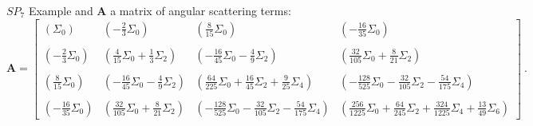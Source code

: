 \documentclass{beamer}
\begin{document}
\begin{frame}{$SP_7$ Example}
  and $\mathbf{A}$ a matrix of angular scattering terms:
  {\tiny
    \begin{equation}
      \mathbf{A} = 
      \begin{bmatrix}
        (\Sigma_0) &
        (-\frac{2}{3}\Sigma_0) &
        (\frac{8}{15}\Sigma_0) &
        (-\frac{16}{35}\Sigma_0) \\
        &&&\\
        (-\frac{2}{3}\Sigma_0) &
        (\frac{4}{15}\Sigma_0 + \frac{1}{3}\Sigma_2) &
        (-\frac{16}{45}\Sigma_0 - \frac{4}{9}\Sigma_2) &
        (\frac{32}{105}\Sigma_0 + \frac{8}{21}\Sigma_2) \\
        &&&\\
        (\frac{8}{15}\Sigma_0) &
        (-\frac{16}{45}\Sigma_0 - \frac{4}{9}\Sigma_2) &
        (\frac{64}{225}\Sigma_0 + \frac{16}{45}\Sigma_2 + \frac{9}{25}\Sigma_4) &
        (-\frac{128}{525}\Sigma_0 - \frac{32}{105}\Sigma_2 - \frac{54}{175}\Sigma_4)
        \\ 
        &&&\\
        (-\frac{16}{35}\Sigma_0) &
        (\frac{32}{105}\Sigma_0 + \frac{8}{21}\Sigma_2) &
        (-\frac{128}{525}\Sigma_0 - \frac{32}{105}\Sigma_2 - \frac{54}{175}\Sigma_4)
        & 
        (\frac{256}{1225}\Sigma_0 + \frac{64}{245}\Sigma_2 +
        \frac{324}{1225}\Sigma_4 + \frac{13}{49}\Sigma_6)
      \end{bmatrix}\:.
      \label{eq:A_matrix}
    \end{equation}
  }
\end{frame}
\end{document}
